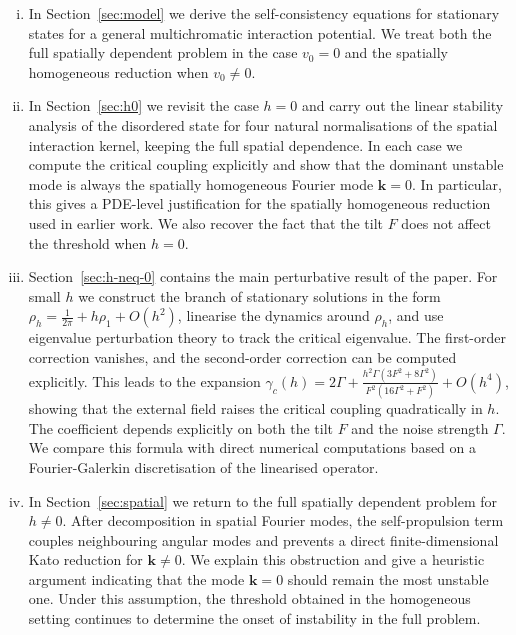 \documentclass[a4paper,11pt]{article}
\theoremstyle{plain}
\theoremstyle{definition}
\theoremstyle{remark}
\newcommand{\bk}{\mathbf{k}}
\begin{document}
\begin{enumerate}[(i)]
\item In Section~\ref{sec:model} we derive the self-consistency equations for stationary states for a general multichromatic interaction potential. We treat both the full spatially dependent problem in the case $v_0=0$ and the spatially homogeneous reduction when $v_0\neq 0$.

\item In Section~\ref{sec:h0} we revisit the case $h=0$ and carry out the linear stability analysis of the disordered state for four natural normalisations of the spatial interaction kernel, keeping the full spatial dependence. In each case we compute the critical coupling explicitly and show that the dominant unstable mode is always the spatially homogeneous Fourier mode $\bk=0$. In particular, this gives a PDE-level justification for the spatially homogeneous reduction used in earlier work. We also recover the fact that the tilt $F$ does not affect the threshold when $h=0$.

\item Section~\ref{sec:h-neq-0} contains the main perturbative result of the paper. For small $h$ we construct the branch of stationary solutions in the form  $\rho_h = \frac{1}{2\pi} + h \rho_1 + O(h^2)$, linearise the dynamics around $\rho_h$, and use eigenvalue perturbation theory to track the critical eigenvalue. The first-order correction vanishes, and the second-order correction can be computed explicitly. This leads to the expansion $\gamma_c(h) = 2\Gamma + \frac{h^2 \Gamma (3F^2 + 8 \Gamma^2)}{F^2(16\Gamma^2 + F^2)} + O(h^4)$, showing that the external field raises the critical coupling quadratically in $h$. The coefficient depends explicitly on both the tilt $F$ and the noise strength $\Gamma$. We compare this formula with direct numerical computations based on a Fourier-Galerkin discretisation of the linearised operator.

\item In Section~\ref{sec:spatial} we return to the full spatially dependent problem for $h\neq 0$. After decomposition in spatial Fourier modes, the self-propulsion term couples neighbouring angular modes and prevents a direct finite-dimensional Kato reduction for $\bk\neq 0$. We explain this obstruction and give a heuristic argument indicating that the mode $\bk=0$ should remain the most unstable one. Under this assumption, the threshold obtained in the homogeneous setting continues to determine the onset of instability in the full problem.
\end{enumerate}
\end{document}
